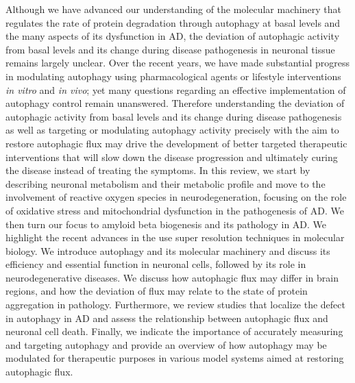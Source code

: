 Although we have advanced our understanding of the molecular machinery that regulates the rate of protein degradation through autophagy at basal levels and the many aspects of its dysfunction in AD, the deviation of autophagic activity from basal levels and its change during disease pathogenesis in neuronal tissue remains largely unclear. Over the recent years, we have made substantial progress in modulating autophagy using pharmacological agents \citep{Berger2006,Hebron2013,Ravikumar2002,Ravikumar2004,Rose2010} or lifestyle interventions \citep{Alirezaei2010,Kuma2004,Mizushima2004a,Scott2004} \textit{in vitro} and \textit{in vivo}; yet many questions regarding an effective implementation of autophagy control remain unanswered. Therefore understanding the deviation of autophagic activity from basal levels and its change during disease pathogenesis as well as targeting or modulating autophagy activity precisely with the aim to restore autophagic flux may drive the development of better targeted therapeutic interventions that will slow down the disease progression and ultimately curing the disease instead of treating the symptoms. In this review, we start by describing neuronal metabolism and their metabolic profile and move to the involvement of reactive oxygen species in neurodegeneration, focusing on the role of oxidative stress and mitochondrial dysfunction in the pathogenesis of AD. We then turn our focus to amyloid beta biogenesis and its pathology in AD.  We highlight the recent advances in the use super resolution techniques in molecular biology. We introduce autophagy and its molecular machinery and discuss its efficiency and essential function in neuronal cells, followed by its role in neurodegenerative diseases. We discuss how autophagic flux may differ in brain regions, and how the deviation of flux may relate to the state of protein aggregation in pathology. Furthermore, we review studies that localize the defect in autophagy in AD and assess the relationship between autophagic flux and neuronal cell death. Finally, we indicate the importance of accurately measuring and targeting autophagy and provide an overview of how autophagy may be modulated for therapeutic purposes in various model systems aimed at restoring autophagic flux. 

